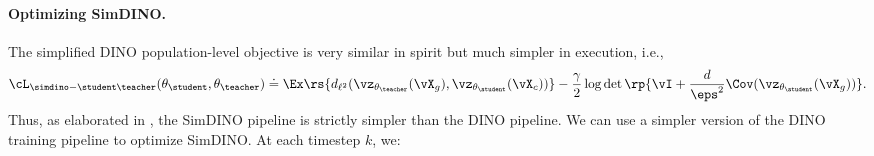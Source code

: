 \documentclass[../../book-main.tex]{subfiles}
\begin{document}
\paragraph{Optimizing SimDINO.} The simplified DINO population-level
objective is very similar in spirit but much simpler in execution, i.e.,
\begin{equation}\label{eq:simdino_loss_teacherstudent}
    \cL_{\simdino-\student\teacher}(\theta_{\student}, \theta_{\teacher}) \doteq
    \Ex\rs{d_{\ell^{2}}(\vz_{\theta_{\teacher}}(\vX_{g}),
    \vz_{\theta_{\student}}(\vX_{c}))} - \frac{\gamma}{2}\log\det\rp{\vI
+ \frac{d}{\eps^{2}}\Cov(\vz_{\theta_{\student}}(\vX_{g}))} .
\end{equation}
Thus, as elaborated in , the SimDINO
pipeline is strictly simpler than the DINO pipeline.
We can use a
simpler version of the DINO training pipeline to optimize SimDINO.
At
each timestep \(k\), we:
\end{document}
